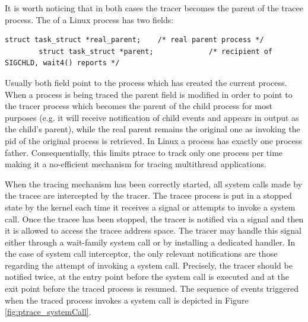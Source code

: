 It is worth noticing that in both cases the tracer becomes the parent of the tracee process. The  of a Linux process has two fields:
\begin{center}
\lstset{escapechar=@,style=c}
\begin{lstlisting}[caption={ Parent and real parent fields with task\_struct Linux}]
		struct task_struct *real_parent;	/* real parent process */
		struct task_struct *parent;				/* recipient of SIGCHLD, wait4() reports */
\end{lstlisting}
\end{center}
Usually both field point to the process which has created the current process. When a process is being traced the parent field is modified in order to point to the tracer process which becomes the parent of the child process for most purposes (e.g. it will receive notification of  child  events  and  appears  in   output  as  the  child's parent), while the real parent remains the original one as invoking  the pid of the original process is retrieved. In Linux a process has exactly one process father. Consequentially, this limits ptrace to track only one process per time making it a no-efficient mechanism for tracing multithread applications. 


When the tracing mechanism has been correctly started, all system calls made by the tracee are intercepted by the tracer. The tracee process is put in a stopped state by the kernel each time it receives a signal or attempts to invoke a system call.  Once the tracee has been stopped, the tracer is notified via a signal  and then it is allowed to access the tracee address space.  The tracer may handle this signal either through a wait-family system call or by installing a dedicated handler. 
In the case of system call interceptor, the only relevant notifications are those regarding the attempt of invoking a system call. Precisely, the tracer should be notified twice, at the entry point before the system call is executed and at the exit point before the traced process is resumed. The sequence of events triggered when the traced process invokes a system call is depicted in Figure  \ref{fig:ptrace_systemCall}.


